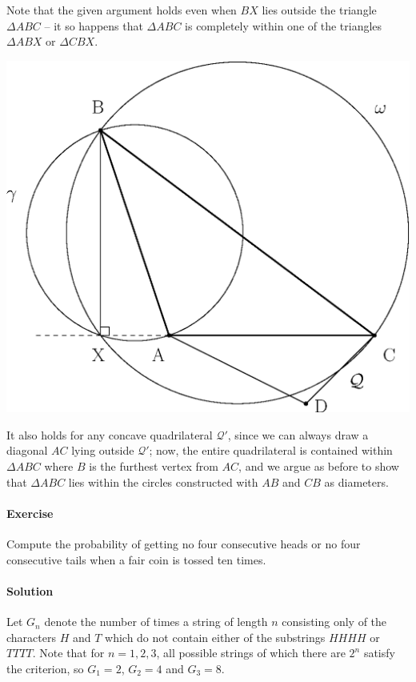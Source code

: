 \documentclass[10pt]{article}
\newcounter{prob}
\def\problem{\stepcounter{prob}\paragraph{Exercise \arabic{prob}}}
\def\solution{\paragraph{Solution}}
\begin{document}
        Note that the given argument holds even when $BX$ lies outside the triangle
        $\Delta ABC$ -- it so happens that $\Delta ABC$ is completely within one of
        the triangles $\Delta ABX$ or $\Delta CBX$. 
        \begin{center}
            \includegraphics[scale=0.7]{./2_2_2.eps}
        \end{center}
        It also holds for any concave quadrilateral $\mathcal{Q}'$, since we can
        always draw a diagonal $AC$ lying outside $\mathcal{Q}'$; now, the entire
        quadrilateral is contained within $\Delta ABC$ where $B$ is the furthest
        vertex from $AC$, and we argue as before to show that $\Delta ABC$ lies
        within the circles constructed with $AB$ and $CB$ as diameters.

        \problem Compute the probability of getting no four consecutive heads or no
        four consecutive tails when a fair coin is tossed ten times.

        \solution Let $G_n$ denote the number of times a string of length $n$
        consisting only of the characters $H$ and $T$ which do not contain either of
        the substrings $HHHH$ or $TTTT$. Note that for $n = 1, 2, 3$, all possible
        strings of which there are $2^n$ satisfy the criterion, so $G_1 = 2$, $G_2 =
        4$ and $G_3 = 8$. \\
\end{document}
